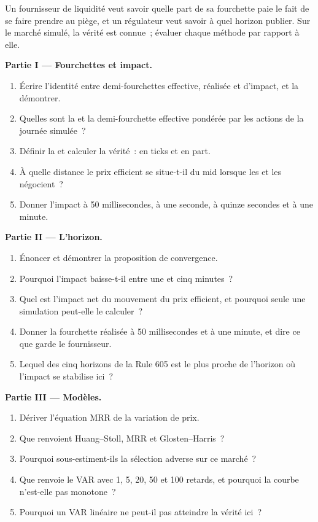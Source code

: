 \begin{problem}\label{pb:mx:decomposing-the-spread:1}
Un fournisseur de liquidité veut savoir quelle part de sa fourchette paie le fait de se faire prendre au piège, et un régulateur veut savoir à quel horizon publier. Sur le
marché simulé, la vérité est connue~; évaluer chaque méthode par rapport à elle.

\medskip\noindent\textbf{Partie I --- Fourchettes et impact.}
\begin{enumerate}
\item Écrire l'identité entre demi-fourchettes effective, réalisée et d'impact, et la démontrer.
\item Quelles sont la  et la demi-fourchette effective pondérée par les actions de la journée simulée~?
\item Définir la  et calculer la vérité~: en ticks et en part.
\item À quelle distance le prix efficient se situe-t-il du mid lorsque les  et les  négocient~?
\item Donner l'impact à 50 millisecondes, à une seconde, à quinze secondes et à une minute.
\end{enumerate}

\medskip\noindent\textbf{Partie II --- L'horizon.}
\begin{enumerate}[resume]
\item Énoncer et démontrer la proposition de convergence.
\item Pourquoi l'impact baisse-t-il entre une et cinq minutes~?
\item Quel est l'impact net du mouvement du prix efficient, et pourquoi seule une simulation peut-elle le calculer~?
\item Donner la fourchette réalisée à 50 millisecondes et à une minute, et dire ce que garde le fournisseur.
\item Lequel des cinq horizons de la Rule 605 est le plus proche de l'horizon où l'impact se stabilise ici~?
\end{enumerate}

\medskip\noindent\textbf{Partie III --- Modèles.}
\begin{enumerate}[resume]
\item Dériver l'équation MRR de la variation de prix.
\item Que renvoient Huang--Stoll, MRR et Glosten--Harris~?
\item Pourquoi sous-estiment-ils la sélection adverse sur ce marché~?
\item Que renvoie le VAR avec 1, 5, 20, 50 et 100 retards, et pourquoi la courbe n'est-elle pas monotone~?
\item Pourquoi un VAR linéaire ne peut-il pas atteindre la vérité ici~?
\end{enumerate}


\end{problem}
